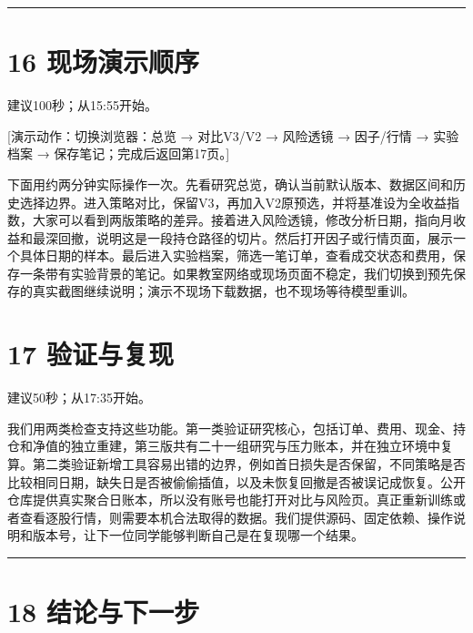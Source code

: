 \documentclass[UTF8,a4paper,12pt]{ctexart}
\begin{document}
\vspace{6mm}\noindent\textcolor{accent!40}{\rule{\textwidth}{0.4pt}}\par

\section*{\color{ink}16  现场演示顺序}

{\small\color{accent}建议100秒；从15:55开始。}\par

{\small\color{accent}[演示动作：切换浏览器：总览 → 对比V3/V2 → 风险透镜 → 因子/行情 → 实验档案 → 保存笔记；完成后返回第17页。]}\par

下面用约两分钟实际操作一次。先看研究总览，确认当前默认版本、数据区间和历史选择边界。进入策略对比，保留V3，再加入V2原预选，并将基准设为全收益指数，大家可以看到两版策略的差异。接着进入风险透镜，修改分析日期，指向月收益和最深回撤，说明这是一段持仓路径的切片。然后打开因子或行情页面，展示一个具体日期的样本。最后进入实验档案，筛选一笔订单，查看成交状态和费用，保存一条带有实验背景的笔记。如果教室网络或现场页面不稳定，我们切换到预先保存的真实截图继续说明；演示不现场下载数据，也不现场等待模型重训。


\newpage
\section*{\color{ink}17  验证与复现}

{\small\color{accent}建议50秒；从17:35开始。}\par

我们用两类检查支持这些功能。第一类验证研究核心，包括订单、费用、现金、持仓和净值的独立重建，第三版共有二十一组研究与压力账本，并在独立环境中复算。第二类验证新增工具容易出错的边界，例如首日损失是否保留，不同策略是否比较相同日期，缺失日是否被偷偷插值，以及未恢复回撤是否被误记成恢复。公开仓库提供真实聚合日账本，所以没有账号也能打开对比与风险页。真正重新训练或者查看逐股行情，则需要本机合法取得的数据。我们提供源码、固定依赖、操作说明和版本号，让下一位同学能够判断自己是在复现哪一个结果。


\vspace{6mm}\noindent\textcolor{accent!40}{\rule{\textwidth}{0.4pt}}\par

\section*{\color{ink}18  结论与下一步}
\end{document}
